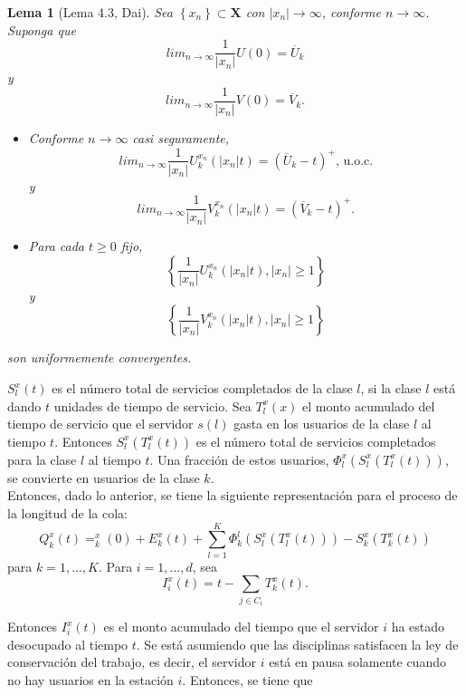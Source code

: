 \documentclass{article}
\newtheorem{Lema}{Lema}
\begin{document}
\begin{Lema}[Lema 4.3, Dai\cite{Dai}]\label{Lema.4.3}
Sea $\left\{x_{n}\right\}\subset \mathbf{X}$ con
$|x_{n}|\rightarrow\infty$, conforme $n\rightarrow\infty$. Suponga
que
\[lim_{n\rightarrow\infty}\frac{1}{|x_{n}|}U\left(0\right)=\overline{U}_{k}\]
y
\[lim_{n\rightarrow\infty}\frac{1}{|x_{n}|}V\left(0\right)=\overline{V}_{k}.\]
\begin{itemize}
\item[a)] Conforme $n\rightarrow\infty$ casi seguramente,
\[lim_{n\rightarrow\infty}\frac{1}{|x_{n}|}U^{x_{n}}_{k}\left(|x_{n}|t\right)=\left(\overline{U}_{k}-t\right)^{+}\textrm{, u.o.c.}\]
y
\[lim_{n\rightarrow\infty}\frac{1}{|x_{n}|}V^{x_{n}}_{k}\left(|x_{n}|t\right)=\left(\overline{V}_{k}-t\right)^{+}.\]

\item[b)] Para cada $t\geq0$ fijo,
\[\left\{\frac{1}{|x_{n}|}U^{x_{n}}_{k}\left(|x_{n}|t\right),|x_{n}|\geq1\right\}\]
y
\[\left\{\frac{1}{|x_{n}|}V^{x_{n}}_{k}\left(|x_{n}|t\right),|x_{n}|\geq1\right\}\]
\end{itemize}
son uniformemente convergentes.
\end{Lema}

$S_{l}^{x}\left(t\right)$ es el n\'umero total de servicios
completados de la clase $l$, si la clase $l$ est\'a dando $t$
unidades de tiempo de servicio. Sea $T_{l}^{x}\left(x\right)$ el
monto acumulado del tiempo de servicio que el servidor
$s\left(l\right)$ gasta en los usuarios de la clase $l$ al tiempo
$t$. Entonces $S_{l}^{x}\left(T_{l}^{x}\left(t\right)\right)$ es
el n\'umero total de servicios completados para la clase $l$ al
tiempo $t$. Una fracci\'on de estos usuarios,
$\Phi_{l}^{x}\left(S_{l}^{x}\left(T_{l}^{x}\left(t\right)\right)\right)$,
se convierte en usuarios de la clase $k$.\\

Entonces, dado lo anterior, se tiene la siguiente representaci\'on
para el proceso de la longitud de la cola:\\

\begin{equation}
Q_{k}^{x}\left(t\right)=_{k}^{x}\left(0\right)+E_{k}^{x}\left(t\right)+\sum_{l=1}^{K}\Phi_{k}^{l}\left(S_{l}^{x}\left(T_{l}^{x}\left(t\right)\right)\right)-S_{k}^{x}\left(T_{k}^{x}\left(t\right)\right)
\end{equation}
para $k=1,\ldots,K$. Para $i=1,\ldots,d$, sea
\[I_{i}^{x}\left(t\right)=t-\sum_{j\in C_{i}}T_{k}^{x}\left(t\right).\]

Entonces $I_{i}^{x}\left(t\right)$ es el monto acumulado del
tiempo que el servidor $i$ ha estado desocupado al tiempo $t$. Se
est\'a asumiendo que las disciplinas satisfacen la ley de
conservaci\'on del trabajo, es decir, el servidor $i$ est\'a en
pausa solamente cuando no hay usuarios en la estaci\'on $i$.
Entonces, se tiene que
\end{document}

